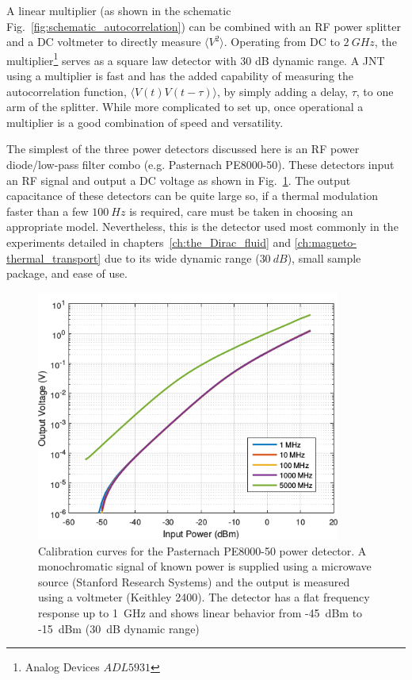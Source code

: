 A linear multiplier (as shown in the schematic Fig.~\ref{fig:schematic_autocorrelation}) can be combined with an RF power splitter and a DC voltmeter to directly measure $\langle V^2\rangle$. Operating from DC to $2~GHz$, the multiplier\footnote{Analog Devices $ADL5931$} serves as a square law detector with 30 dB dynamic range. A JNT using a multiplier is fast and has the added capability of measuring the autocorrelation function, $\langle V(t)V(t-\tau)\rangle$, by simply adding a delay, $\tau$, to one arm of the splitter. While more complicated to set up, once operational a multiplier is a good combination of speed and versatility.

The simplest of the three power detectors discussed here is an RF power diode/low-pass filter combo (e.g. Pasternach PE8000-50). These detectors input an RF signal and output a DC voltage as shown in Fig.~\ref{fig:PE8000}. The output capacitance of these detectors can be quite large so, if a thermal modulation faster than a few $100~Hz$ is required, care must be taken in choosing an appropriate model. Nevertheless, this is the detector used most commonly in the experiments detailed in chapters~\ref{ch:the_Dirac_fluid} and \ref{ch:magneto-thermal_transport} due to its wide dynamic range ($30~dB$), small sample package, and ease of use.

\begin{figure}
\centering
\includegraphics[width = 100mm]{figures/Johnson_noise_thermometry/PE8000-50.png}
\caption{Calibration curves for the Pasternach PE8000-50 power detector. A monochromatic signal of known power is supplied using a microwave source (Stanford Research Systems) and the output is measured using a voltmeter (Keithley 2400). The detector has a flat frequency response up to 1~GHz and shows linear behavior from -45~dBm to -15~dBm (30~dB dynamic range)}
\label{fig:PE8000}
\end{figure}

